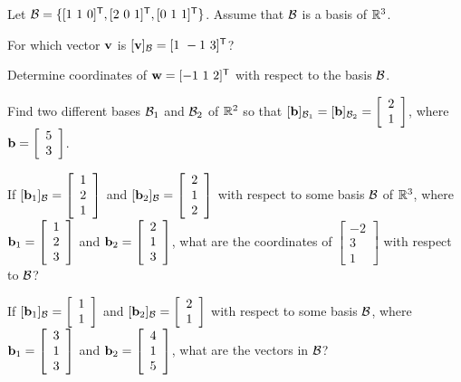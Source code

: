 \item Let $\CB=\{[1 \ 1 \ 0]^{\tr}, [2 \ 0 \ 1]^{\tr}, [0 \ 1 \ 1]^{\tr}\}$. Assume that $\mathcal{B}$ is a basis of $\mathbb{R}^3$. 
\ba 
\item For which vector $\mathbf{v}$ is $[\mathbf{v}]_{\mathcal{B}} = [ 1 \ -1 \ 3 ]^{\mathsf{T}}$?

\item Determine coordinates of $\vw = [-1 \ 1 \ 2]^{\tr}$ with respect to the basis $\mathcal{B}$.
\ea

\item Find two different bases $\mathcal{B}_1$ and $\mathcal{B}_2$ of $\mathbb{R}^2$ so that $[\mathbf{b}]_{\mathcal{B}_1} = [\mathbf{b}]_{\mathcal{B}_2} = \left[ \begin{array}{c} 2\\1 \end{array}\right]$, where $\mathbf{b}=\left[ \begin{array}{c} 5\\3 \end{array} \right]$.

\item If  $[\mathbf{b}_1]_{\mathcal{B}} = \left[ \begin{array}{c} 1\\2\\1 \end{array} \right]$ and $[\mathbf{b}_2]_{\mathcal{B}} = \left[ \begin{array}{c} 2\\1\\2 \end{array} \right]$ with respect to some basis $\mathcal{B}$ of $\mathbb{R}^3$, where $\mathbf{b}_1=\left[ \begin{array}{c} 1\\2\\3 \end{array} \right]$ and $\mathbf{b}_2=\left[ \begin{array}{c} 2\\1\\3 \end{array} \right]$, what are the coordinates of $\left[ \begin{array}{r} -2\\3\\1 \end{array} \right]$ with respect to $\mathcal{B}$?

\item If $[\mathbf{b}_1]_{\mathcal{B}} = \left[ \begin{array}{c} 1\\1 \end{array} \right]$ and $[\mathbf{b}_2]_{\mathcal{B}} = \left[ \begin{array}{c} 2\\1 \end{array} \right]$ with respect to some basis $\mathcal{B}$, where  $\mathbf{b}_1=\left[ \begin{array}{c} 3\\1\\3 \end{array} \right]$ and $\mathbf{b}_2=\left[ \begin{array}{c} 4\\1\\5 \end{array} \right]$, what are the vectors in $\mathcal{B}$?

